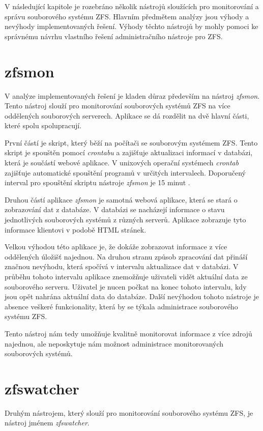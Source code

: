 V následující kapitole je rozebráno několik nástrojů sloužících pro monitorování a správu souborového systému ZFS. Hlavním předmětem analýzy jsou výhody a nevýhody implementovaných řešení. Výhody těchto nástrojů by mohly pomoci ke správnému návrhu vlastního řešení administračního nástroje pro ZFS.
\section{zfsmon}
V analýze implementovaných řešení je kladen důraz především na nástroj \emph{zfsmon}. Tento nástroj slouží pro monitorování souborových systémů ZFS na více oddělených souborových serverech. Aplikace se dá rozdělit na dvě hlavní části, které spolu spolupracují.

První částí je skript, který běží na počítači se souborovým systémem ZFS. Tento skript je spouštěn pomocí \emph{crontabu} a zajišťuje aktualizaci informací v databázi, která je součástí webové aplikace. V unixových operační systémech \emph{crontab} zajišťuje automatické spouštění programů v určitých intervalech. Doporučený interval pro spouštění skriptu nástroje \emph{zfsmon} je 15 minut \cite{zfsmon}.

Druhou částí aplikace \emph{zfsmon} je samotná webová aplikace, která se stará o zobrazování dat z databáze. V databázi se nacházejí informace o stavu jednotlivých souborových systémů z různých serverů. Aplikace zobrazuje tyto informace klientovi v podobě HTML stránek.

Velkou výhodou této aplikace je, že dokáže zobrazovat informace z více oddělených úložišť najednou. Na druhou stranu způsob zpracování dat přináší značnou nevýhodu, která spočívá v intervalu aktualizace dat v databázi. V průběhu tohoto intervalu aplikace znemožňuje uživateli vidět aktuální data ze souborového serveru. Uživatel je nucen počkat na konec tohoto intervalu, kdy jsou opět nahrána aktuální data do databáze. Další nevýhodou tohoto nástroje je absence veškeré funkcionality, která by se týkala administrace souborového systému ZFS.

Tento nástroj nám tedy umožňuje kvalitně monitorovat informace z více zdrojů najednou, ale neposkytuje nám možnost administrace monitorovaných souborových systémů.
\section{zfswatcher}
Druhým nástrojem, který slouží pro monitorování souborového systému ZFS, je nástroj jménem \emph{zfswatcher}.

